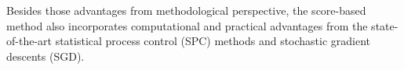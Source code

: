 \documentclass[twoside,11pt]{article}
\begin{document}


Besides those advantages from methodological perspective, the score-based method also incorporates computational and practical advantages from the state-of-the-art statistical process control (SPC) methods and stochastic gradient descents (SGD).
\end{document}
